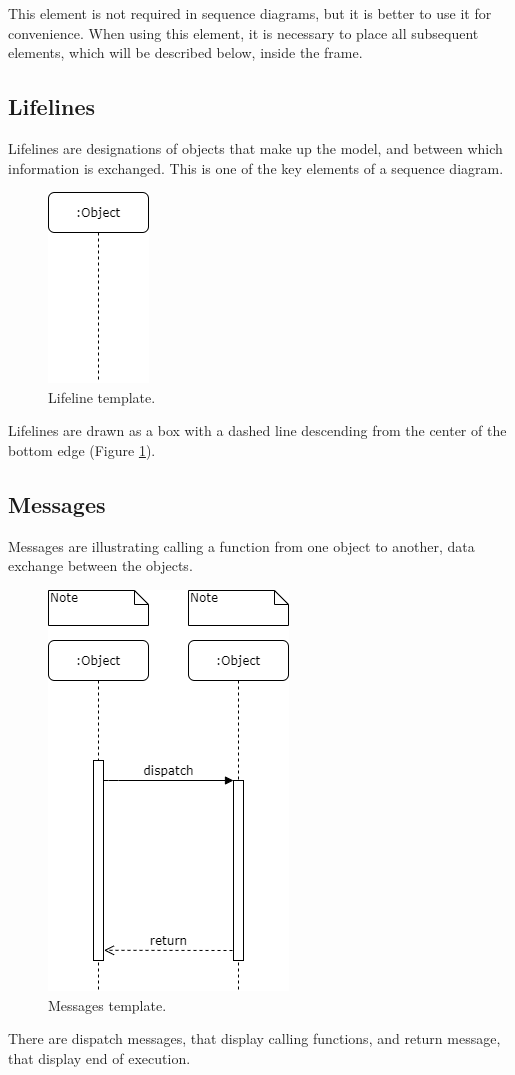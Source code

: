 \documentclass[10pt,twoside,slovak,a4paper]{article}
\begin{document}
This element is not required in sequence diagrams, but it is better to use it for convenience. When using this element, it is necessary to place all subsequent elements, which will be described below, inside the frame.

\subsection{Lifelines} \label{notation:lifelines}
Lifelines are designations of objects that make up the model, and between which information is exchanged. This is one of the key elements of a sequence diagram.
\begin{figure}[tbh]
	\centering
	\includegraphics[scale=0.6]{lifeline.png}
	\caption{Lifeline template.}
	\label{fig:lifeline}
\end{figure}

Lifelines are drawn as a box with a dashed line descending from the center of the bottom edge (Figure \ref{fig:lifeline})\cite{IBM_SD}.


\subsection{Messages} \label{notation:messages}
Messages are illustrating calling a function from one object to another, data exchange between the objects.
\begin{figure}[tbh]
	\centering
	\includegraphics[scale=0.6]{Message.png}
	\caption{Messages template.}
	\label{fig:messages}
\end{figure}
There are dispatch messages, that display calling functions, and return message, that display end of execution\cite{UML}.
\end{document}
